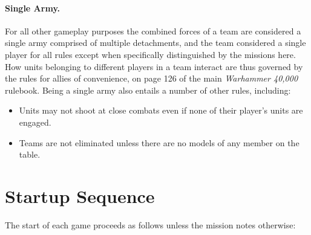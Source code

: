 \paragraph{Single Army.}
For all other gameplay purposes the combined forces of a team are
considered a single army comprised of multiple detachments, and the
team considered a single player for all rules except when specifically
distinguished by the missions here. How units belonging to different
players in a team interact are thus governed by the rules for allies
of convenience, on page 126 of the main \emph{Warhammer 40,000}
rulebook.  Being a single army also entails a number of other rules,
including:
\begin{itemize}
\item Units may not shoot at close combats even if none of their player's
units are engaged.

\item Teams are not eliminated unless there are no models of any member on
the table.
\end{itemize}



\section{Startup Sequence}

The start of each game proceeds as follows unless the mission notes
otherwise:

